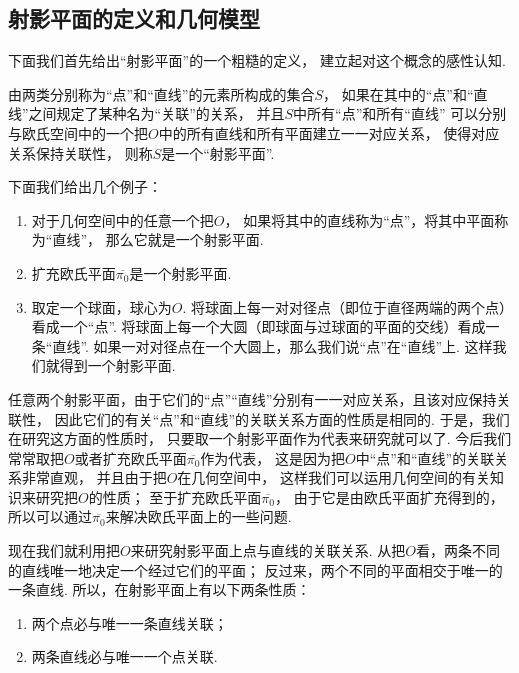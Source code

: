 \subsection{射影平面的定义和几何模型}
下面我们首先给出“射影平面”的一个粗糙的定义，
建立起对这个概念的感性认知.

由两类分别称为“点”和“直线”的元素所构成的集合\(S\)，
如果在其中的“点”和“直线”之间规定了某种名为“关联”的关系，
并且\(S\)中所有“点”和所有“直线”
可以分别与欧氏空间中的一个把\(O\)中的所有直线和所有平面建立一一对应关系，
使得对应关系保持关联性，
则称\(S\)是一个“射影平面”.

下面我们给出几个例子：\begin{enumerate}
	\item
	对于几何空间中的任意一个把\(O\)，
	如果将其中的直线称为“点”，将其中平面称为“直线”，
	那么它就是一个射影平面.

	\item
	扩充欧氏平面\(\overline{\pi_0}\)是一个射影平面.

	\item
	取定一个球面，球心为\(O\).
	将球面上每一对{对径点}（即位于直径两端的两个点）看成一个“点”.
	将球面上每一个大圆（即球面与过球面的平面的交线）看成一条“直线”.
	如果一对对径点在一个大圆上，那么我们说“点”在“直线”上.
	这样我们就得到一个射影平面.
\end{enumerate}

任意两个射影平面，由于它们的“点”“直线”分别有一一对应关系，且该对应保持关联性，
因此它们的有关“点”和“直线”的关联关系方面的性质是相同的.
于是，我们在研究这方面的性质时，
只要取一个射影平面作为代表来研究就可以了.
今后我们常常取把\(O\)或者扩充欧氏平面\(\overline{\pi_0}\)作为代表，
这是因为把\(O\)中“点”和“直线”的关联关系非常直观，
并且由于把\(O\)在几何空间中，
这样我们可以运用几何空间的有关知识来研究把\(O\)的性质；
至于扩充欧氏平面\(\overline{\pi_0}\)，
由于它是由欧氏平面扩充得到的，
所以可以通过\(\overline{\pi_0}\)来解决欧氏平面上的一些问题.

现在我们就利用把\(O\)来研究射影平面上点与直线的关联关系.
从把\(O\)看，两条不同的直线唯一地决定一个经过它们的平面；
反过来，两个不同的平面相交于唯一的一条直线.
所以，在射影平面上有以下两条性质：
\begin{enumerate}
	\item 两个点必与唯一一条直线关联；
	\item 两条直线必与唯一一个点关联.
\end{enumerate}

